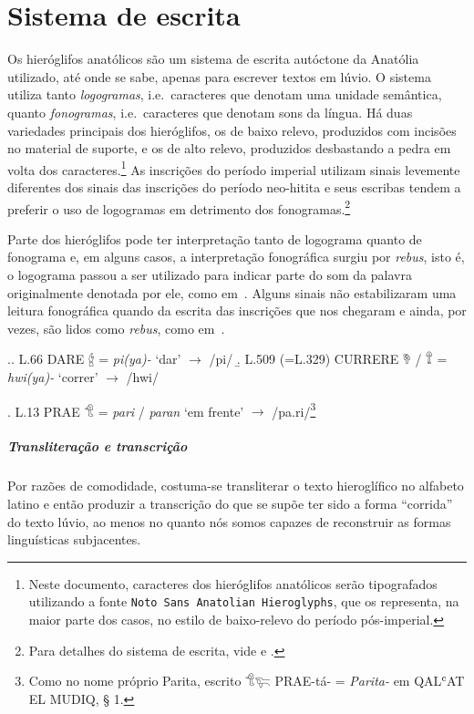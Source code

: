 
\chapter{Sistema de escrita}

Os hieróglifos anatólicos são um sistema de escrita autóctone da Anatólia
utilizado, até onde se sabe, apenas para escrever textos em lúvio.
O sistema utiliza tanto \emph{logogramas}, i.e.\ caracteres que denotam uma
unidade semântica, quanto \emph{fonogramas}, i.e.\ caracteres que denotam sons da
língua.
Há duas variedades principais dos hieróglifos, os de baixo relevo, produzidos
com incisões no material de suporte, e os de alto relevo, produzidos
desbastando a pedra em volta dos caracteres.\footnote{Neste documento,
	caracteres dos hieróglifos anatólicos serão tipografados utilizando a fonte
		{\tiny\texttt{Noto Sans Anatolian Hieroglyphs}}, que os representa, na
	maior parte dos casos, no estilo de
	baixo-relevo do período pós\hyp{}imperial.}
As inscrições do período imperial utilizam sinais levemente diferentes dos
sinais das inscrições do período neo-hitita e seus escribas tendem a preferir
o uso de logogramas em detrimento dos fonogramas.\footnote{%
	Para detalhes do sistema de escrita, vide
	\citet[pp.\ 6ff.\ e pp.\ 23ff.]{CHLI11} e \citet[pp. 354ff.]{CHLI3}.
}


Parte dos hieróglifos pode ter interpretação tanto de logograma quanto de
fonograma e, em alguns casos, a interpretação fonográfica surgiu por
\emph{rebus}, isto é, o logograma passou a ser utilizado para indicar parte do
som da palavra originalmente denotada por ele, como em~\Next.
Alguns sinais não estabilizaram uma leitura fonográfica quando da escrita das
inscrições que nos chegaram e ainda, por vezes, são lidos como \emph{rebus},
como em~\NNext.

\ex.\a. L.66 DARE 𔑈 = \emph{pi{(ya)}-} `dar' $\rightarrow$ /pi/
\b. L.509 (=L.329) CURRERE 𔘰 \slash{} 𔕰 = \emph{hwi{(ya)}-} `correr' $\rightarrow$
/hwi/

\ex. L.13 PRAE 𔐎 = \emph{pari} \slash{} \emph{paran} `em frente' $\rightarrow$
/pa.ri/\footnote{Como no nome próprio Parita, escrito 𔐎𔐞 PRAE-tá- =
	\emph{Parita-} em QALʿAT EL MUDIQ, § 1.}

\paragraph{Transliteração e transcrição}
Por razões de comodidade, costuma-se transliterar o texto hieroglífico no
alfabeto latino e então produzir a transcrição do que se supõe ter sido a
forma ``corrida'' do texto lúvio, ao menos no quanto nós somos capazes de
reconstruir as formas linguísticas subjacentes.

